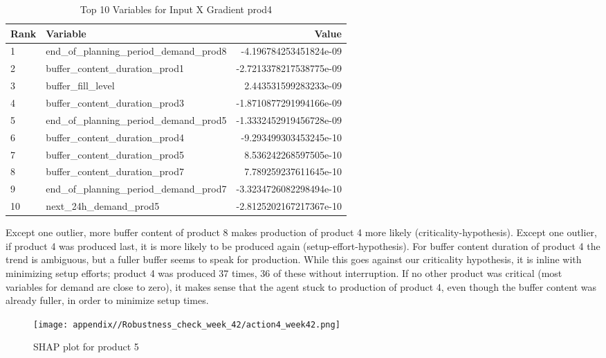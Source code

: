 \begin{table}[ht!]
    \footnotesize
    \centering
    \caption{Top 10 Variables for Input X Gradient prod4}
    \label{tab:top_variables_prod4}
    \begin{tabularx}{\textwidth}{lXr}
        \toprule
        \textbf{Rank} & \textbf{Variable}                        & \textbf{Value}          \\
        \midrule
        1             & end\_of\_planning\_period\_demand\_prod8 & -4.196784253451824e-09  \\
        2             & buffer\_content\_duration\_prod1         & -2.7213378217538775e-09 \\
        3             & buffer\_fill\_level                      & 2.443531599283233e-09   \\
        4             & buffer\_content\_duration\_prod3         & -1.8710877291994166e-09 \\
        5             & end\_of\_planning\_period\_demand\_prod5 & -1.3332452919456728e-09 \\
        6             & buffer\_content\_duration\_prod4         & -9.293499303453245e-10  \\
        7             & buffer\_content\_duration\_prod5         & 8.536242268597505e-10   \\
        8             & buffer\_content\_duration\_prod7         & 7.789259237611645e-10   \\
        9             & end\_of\_planning\_period\_demand\_prod7 & -3.3234726082298494e-10 \\
        10            & next\_24h\_demand\_prod5                 & -2.8125202167217367e-10 \\
        \bottomrule
    \end{tabularx}
\end{table}
\FloatBarrier


Except one outlier, more buffer content of product 8 makes production of product 4 more likely (criticality-hypothesis).
Except one outlier, if product 4 was produced last, it is more likely to be produced again (setup-effort-hypothesis).
For buffer content duration of product 4 the trend is ambiguous, but a fuller buffer seems to speak for production. While this goes against our criticality hypothesis, it is inline with minimizing setup efforts; product 4 was produced 37 times, 36 of these without interruption. If no other product was critical (most variables for demand are close to zero), it makes sense that the agent stuck to production of product 4, even though the buffer content was already fuller, in order to minimize setup times.
\begin{figure}
    \centering
    \texttt{[image: appendix//Robustness\_check\_week\_42/action4\_week42.png]}
    \caption{SHAP plot for product 5}
    \label{fig:agg5-week42}
\end{figure}

